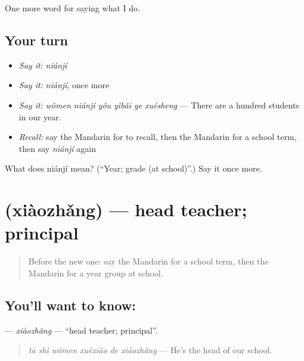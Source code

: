 \begin{grammarlens}[title={What you've built}]
One more word for saying what I do.
\end{grammarlens}

\subsection*{Your turn}
\begin{itemize}
\raggedright
  \item \emph{Say it:} \emph{niánjí}
  \item \emph{Say it:} \emph{niánjí}, once more
  \item \emph{Say it:} \emph{wǒmen niánjí yǒu yìbǎi ge xuésheng} — There are a hundred students in our year.
  \item \emph{Recall:} say the Mandarin for to recall, then the Mandarin for a school term, then say \emph{niánjí} again
\end{itemize}

\begin{tcolorbox}[breakable,colback=teal!4,colframe=teal!35!black,title={Before you move on}]
What does niánjí mean? (\textquotedblleft{}Year; grade (at school)\textquotedblright{}.) Say it once more.
\end{tcolorbox}
\section[\texorpdfstring{\zh{校长} (xiàozhǎng)}{校长 (xiàozhǎng)}]{ (xiàozhǎng) — head teacher; principal}

\label{lesson:ZH-C248-xiaozhang}



\begin{quote}
Before the new one: say the Mandarin for a school term, then the Mandarin for a year group at school.
\end{quote}

\subsection*{You'll want to know: }
\textbf{} — \emph{xiàozhǎng} — \textquotedblleft{}head teacher; principal\textquotedblright{}.

\begin{quote}
\textbf{} \emph{tā shì wǒmen xuéxiào de xiàozhǎng} — He's the head of our school.
\end{quote}

